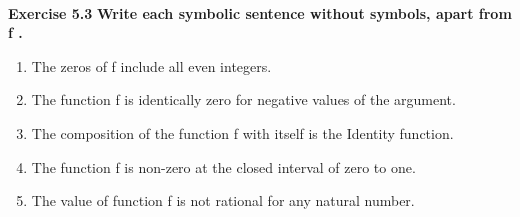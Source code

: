 \documentclass{article}
\begin{document}
	\text{}\\
	\textbf{\large\color{blue} Exercise 5.3} \textbf{Write each symbolic sentence without symbols, apart from f .}
	
	\begin{enumerate}
		\item 
		The zeros of f include all even integers.
		\item 
		The function f is identically zero for negative values of the
		argument.
		\item 
		The composition of the function f with itself is the Identity function.	
		\item 
		The function f is non-zero at the closed interval of zero to one.
		\item 
		The value of function f is not rational for any natural number.
	\end{enumerate}
\end{document}
